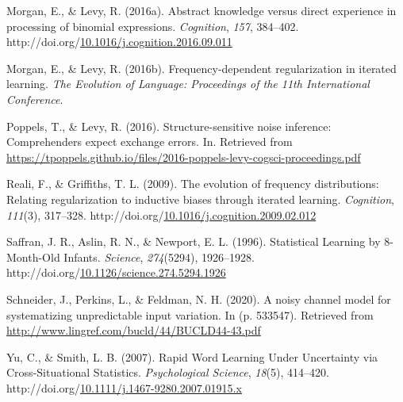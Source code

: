 \documentclass[10pt, letterpaper]{article}
\newenvironment{CSLReferences}%
  {}%
  {\par}
\begin{document}
\begin{CSLReferences}{1}{0}
\leavevmode{}%
Morgan, E., \& Levy, R. (2016a). Abstract knowledge versus direct
experience in processing of binomial expressions. \emph{Cognition},
\emph{157}, 384--402.
http://doi.org/\href{https://doi.org/10.1016/j.cognition.2016.09.011}{10.1016/j.cognition.2016.09.011}

\leavevmode{}%
Morgan, E., \& Levy, R. (2016b). Frequency-dependent regularization in
iterated learning. \emph{The Evolution of Language: Proceedings of the
11th International Conference}.

\leavevmode{}%
Poppels, T., \& Levy, R. (2016). Structure-sensitive noise inference:
Comprehenders expect exchange errors. In. Retrieved from
\url{https://tpoppels.github.io/files/2016-poppels-levy-cogsci-proceedings.pdf}

\leavevmode{}%
Reali, F., \& Griffiths, T. L. (2009). The evolution of frequency
distributions: Relating regularization to inductive biases through
iterated learning. \emph{Cognition}, \emph{111}(3), 317--328.
http://doi.org/\href{https://doi.org/10.1016/j.cognition.2009.02.012}{10.1016/j.cognition.2009.02.012}

\leavevmode{}%
Saffran, J. R., Aslin, R. N., \& Newport, E. L. (1996). Statistical
Learning by 8-Month-Old Infants. \emph{Science}, \emph{274}(5294),
1926--1928.
http://doi.org/\href{https://doi.org/10.1126/science.274.5294.1926}{10.1126/science.274.5294.1926}

\leavevmode{}%
Schneider, J., Perkins, L., \& Feldman, N. H. (2020). A noisy channel
model for systematizing unpredictable input variation. In (p. 533547).
Retrieved from \url{http://www.lingref.com/bucld/44/BUCLD44-43.pdf}

\leavevmode{}%
Yu, C., \& Smith, L. B. (2007). Rapid Word Learning Under Uncertainty
via Cross-Situational Statistics. \emph{Psychological Science},
\emph{18}(5), 414--420.
http://doi.org/\href{https://doi.org/10.1111/j.1467-9280.2007.01915.x}{10.1111/j.1467-9280.2007.01915.x}

\end{CSLReferences}


\end{document}
